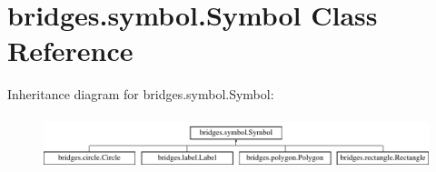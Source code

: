 \hypertarget{classbridges_1_1symbol_1_1_symbol}{}\section{bridges.\+symbol.\+Symbol Class Reference}
\label{classbridges_1_1symbol_1_1_symbol}
Inheritance diagram for bridges.\+symbol.\+Symbol\+:\begin{figure}[H]
\begin{center}
\leavevmode
\includegraphics[height=1.564246cm]{classbridges_1_1symbol_1_1_symbol}
\end{center}
\end{figure}
